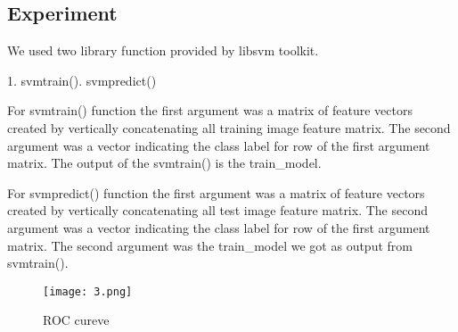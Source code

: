 \subsection{Experiment}
\begin{flushleft}
  We used two library function provided by libsvm toolkit.\break
  
  1. svmtrain(). svmpredict()\break

  For svmtrain() function the first argument was a matrix of feature vectors created 
  by vertically concatenating all training image feature matrix.
  The second argument was a vector indicating the class label for row of the first argument matrix.
  The output of the svmtrain() is the train\_model. \break

  For svmpredict() function the first argument was a matrix of feature vectors created 
  by vertically concatenating all test image feature matrix.
  The second argument was a vector indicating the class label for row of the first argument matrix.
  The second argument was the train\_model we got as output from svmtrain().
  
\begin{figure}[!htb]
\begin{center}
  \texttt{[image: 3.png]}
  \caption{ROC cureve}\label{fig:fig_a}
\endminipage\hfill
\end{center}
\end{figure}
  
\end{flushleft}
\break